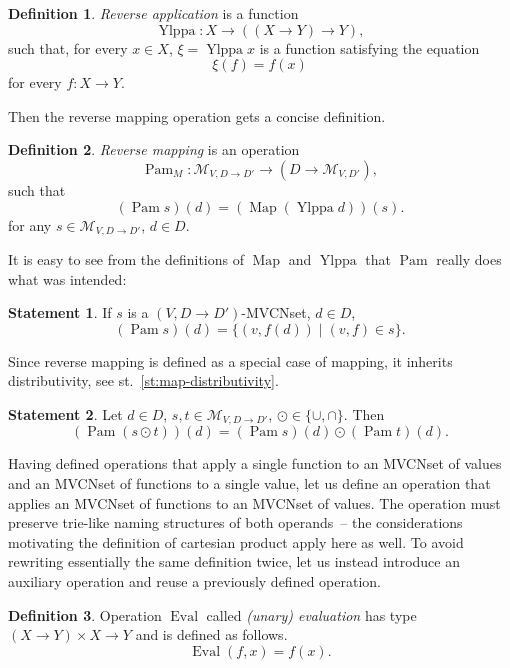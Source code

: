 \documentclass{article}
\theoremstyle{definition}
\newtheorem{Df}{Definition}
\newtheorem{St}{Statement}
\newcommand{\setcharmvcn}{M}
\newcommand{\setsymbol}[3]{\mathcal{#1}_{#2,#3}}
\newcommand{\setmvcn}[2]{\setsymbol{\setcharmvcn}{#1}{#2}}
\newcommand{\fmap}{\operatorname{Map}}
\newcommand{\fpam}{\operatorname{Pam}}
\newcommand{\ylppa}{\operatorname{Ylppa}}
\newcommand{\eval}{\operatorname{Eval}}
\begin{document}
\begin{Df}\label{df:ylppa}
\emph{Reverse application} is a function
\[
  \ylppa : X \to ((X \to Y) \to Y),
\]
such that, for every $x\in X$, $\xi = \ylppa x$ is a function satisfying the
equation
\[
  \xi(f) = f(x)
\]
for every $f: X\to Y$.
\end{Df}

Then the reverse mapping operation gets a concise definition.

\begin{Df}\label{df:mvcn-pam}
\emph{Reverse mapping} is an operation
\[
  \fpam_{\setcharmvcn} : \setmvcn{V}{D \to D'} \to (D \to \setmvcn{V}{D'}),
\]
such that
\[
  (\fpam s)(d) = (\fmap (\ylppa d))(s) .
\]
for any $s\in \setmvcn{V}{D \to D'}$, $d\in D$.
\end{Df}

It is easy to see from the definitions of $\fmap$ and $\ylppa$ that $\fpam$
really does what was intended:

\begin{St}\label{st:mvcn-pam}
If $s$ is a $(V, D\to D')$-MVCNset, $d\in D$,
\[
  (\fpam s)(d) = \{ (v, f(d)) \mid (v, f) \in s \} .
\]
\end{St}

Since reverse mapping is defined as a special case of mapping, it inherits
distributivity, see st.~\ref{st:map-distributivity}.

\begin{St}\label{st:pam-distributivity}
Let $d\in D$, $s, t \in \setmvcn{V}{D \to D'}$, $\odot \in \{\cup, \cap \}$. Then
\[
  (\fpam (s \odot t))(d) = (\fpam s)(d) \odot (\fpam t)(d) .
\]
\end{St}

Having defined operations that apply a single function to an MVCNset of values
and an MVCNset of functions to a single value, let us define an
operation that applies an MVCNset of functions to an MVCNset of values. The
operation must preserve trie-like naming structures of both operands~-- the
considerations motivating the definition of cartesian product apply here
as well. To avoid rewriting essentially the same definition twice, let us
instead introduce an auxiliary operation and reuse a previously defined
operation.

\begin{Df}\label{df:eval}
Operation $\eval$ called \emph{(unary) evaluation} has type
$(X \to Y) \times X \to Y$ and is defined as follows.
\[
  \eval (f, x) = f(x) .
\]
\end{Df}
\end{document}
